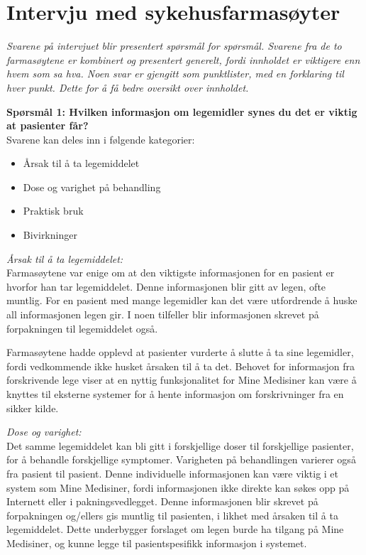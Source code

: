 \chapter{Intervju med sykehusfarmasøyter} \label{chap:interview1stWorkshop}

\textit{Svarene på intervjuet blir presentert spørsmål for spørsmål. Svarene fra de to farmasøytene er kombinert og presentert generelt, fordi innholdet er viktigere enn hvem som sa hva. Noen svar er gjengitt som punktlister, med en forklaring til hver punkt. Dette for å få bedre oversikt over innholdet.} 

\textbf{Spørsmål 1: Hvilken informasjon om legemidler synes du det er viktig at pasienter får?}\\
Svarene kan deles inn i følgende kategorier:
\begin{itemize}
\item Årsak til å ta legemiddelet
\item Dose og varighet på behandling
\item Praktisk bruk
\item Bivirkninger
\end{itemize}


\textit{Årsak til å ta legemiddelet:} \\
Farmasøytene var enige om at den viktigste informasjonen for en pasient er hvorfor han tar legemiddelet. Denne informasjonen blir gitt av legen, ofte muntlig. For en pasient med mange legemidler kan det være utfordrende å huske all informasjonen legen gir. I noen tilfeller blir informasjonen skrevet på forpakningen til legemiddelet også. 

Farmasøytene hadde opplevd at pasienter vurderte å slutte å ta sine legemidler, fordi vedkommende ikke husket årsaken til å ta det. Behovet for informasjon fra forskrivende lege viser at en nyttig funksjonalitet for Mine Medisiner kan være å knyttes til eksterne systemer for å hente informasjon om forskrivninger fra en sikker kilde. 

\textit{Dose og varighet:} \\
Det samme legemiddelet kan bli gitt i forskjellige doser til forskjellige pasienter, for å behandle forskjellige symptomer. Varigheten på behandlingen varierer også fra pasient til pasient. Denne individuelle informasjonen kan være viktig i et system som Mine Medisiner, fordi informasjonen ikke direkte kan søkes opp på Internett eller i pakningsvedlegget. Denne informasjonen blir skrevet på forpakningen og/ellers gis muntlig til pasienten, i likhet med årsaken til å ta legemiddelet. Dette underbygger forslaget om legen burde ha tilgang på Mine Medisiner, og kunne legge til pasientspesifikk informasjon i systemet.

